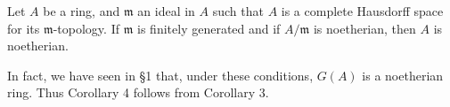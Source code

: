 Let $A$ be a ring, and $\mathfrak{m}$ an ideal in $A$ such that $A$ is a complete Hausdorff space for its $\mathfrak{m}$-topology. If $\mathfrak{m}$ is finitely generated and if $A/\mathfrak{m}$ is noetherian, then $A$ is noetherian.

In fact, we have seen in §1 that, under these conditions, $G(A)$ is a noetherian ring. Thus Corollary 4 follows from Corollary 3.
